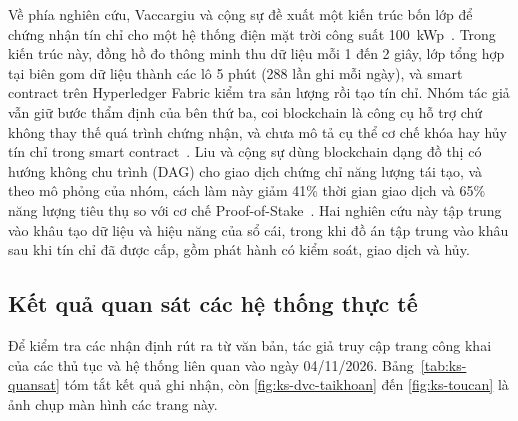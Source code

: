 Về phía nghiên cứu, Vaccargiu và cộng sự đề xuất một kiến trúc bốn lớp để chứng nhận tín chỉ cho một hệ thống điện mặt trời công suất 100~kWp~\cite{vaccargiu2026blockchain}. Trong kiến trúc này, đồng hồ đo thông minh thu dữ liệu mỗi 1 đến 2 giây, lớp tổng hợp tại biên gom dữ liệu thành các lô 5 phút (288 lần ghi mỗi ngày), và smart contract trên Hyperledger Fabric kiểm tra sản lượng rồi tạo tín chỉ. Nhóm tác giả vẫn giữ bước thẩm định của bên thứ ba, coi blockchain là công cụ hỗ trợ chứ không thay thế quá trình chứng nhận, và chưa mô tả cụ thể cơ chế khóa hay hủy tín chỉ trong smart contract~\cite{vaccargiu2026blockchain}. Liu và cộng sự dùng blockchain dạng đồ thị có hướng không chu trình (DAG) cho giao dịch chứng chỉ năng lượng tái tạo, và theo mô phỏng của nhóm, cách làm này giảm 41\% thời gian giao dịch và 65\% năng lượng tiêu thụ so với cơ chế Proof-of-Stake~\cite{liu2024blockchain}. Hai nghiên cứu này tập trung vào khâu tạo dữ liệu và hiệu năng của sổ cái, trong khi đồ án tập trung vào khâu sau khi tín chỉ đã được cấp, gồm phát hành có kiểm soát, giao dịch và hủy.

\FloatBarrier
\subsection*{Kết quả quan sát các hệ thống thực tế}
\label{subsec:ks-quansat}

Để kiểm tra các nhận định rút ra từ văn bản, tác giả truy cập trang công khai của các thủ tục và hệ thống liên quan vào ngày 04/11/2026. Bảng~\ref{tab:ks-quansat} tóm tắt kết quả ghi nhận, còn \autoref{fig:ks-dvc-taikhoan} đến \autoref{fig:ks-toucan} là ảnh chụp màn hình các trang này.

